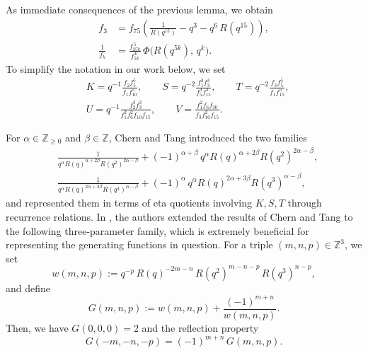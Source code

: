 \documentclass{amsart}
\theoremstyle{definition}
\begin{document}
As immediate consequences of the previous lemma, we obtain
\begin{align}
\label{eq.f3}
f_3&=f_{75}\left(\frac1{R(q^{15})}-q^{3}-q^{6}\,R(q^{15})\right),\\
\label{eq.recip} \frac{1}{f_k}&=\frac{f_{25k}^{\,5}}{f_{5k}^{\,6}}\,\Phi\!\bigl(R(q^{5k}),\,q^k\bigr).
\end{align}
To simplify the notation in our work below, we set
\begin{align}
 \label{K-X}  &K=q^{-1}\frac{f_2f_5^{5}}{f_1f_{10}^{5}},\qquad
S=q^{-2}\frac{f_1^{3}f_3^{3}}{f_5^{3}f_{15}^{3}},\qquad
T=q^{-2}\frac{f_3f_5^{5}}{f_1f_{15}^{5}},\\
\label{V-def}&U=q^{-1}\frac{f_2^{3}f_3^{3}}
{f_1^{2}f_6^{2}f_{10}f_{15}},\qquad V=\frac{f_1^{2}f_6f_{30}}{f_3f_{10}^{2}f_{15}}.
\end{align}

For $\alpha\in\mathbb{Z}_{\ge0}$ and $\beta\in\mathbb{Z}$, Chern and Tang
\cite{CT2021} introduced the two families
\begin{align*}
	&\frac{1}{q^{\alpha}R(q)^{\alpha+2\beta}R(q^{2})^{2\alpha-\beta}}
	+(-1)^{\alpha+\beta}\,q^{\alpha}R(q)^{\alpha+2\beta}R(q^{2})^{2\alpha-\beta},\\
	&\frac{1}{q^{\alpha}R(q)^{2\alpha+3\beta}R(q^{3})^{\alpha-\beta}}
	+(-1)^{\alpha}\,q^{\alpha}R(q)^{2\alpha+3\beta}R(q^{3})^{\alpha-\beta},
\end{align*}
and represented them in terms of eta quotients involving $K, S, T$ through recurrence relations. In \cite{PaudelSellersWang}, the authors extended the results of Chern and Tang to the following three-parameter family, which is extremely beneficial for representing the generating functions in question. For a triple $(m,n,p)\in\mathbb{Z}^{3}$, we set
\begin{equation*}
w(m,n,p):=q^{-p}\,R(q)^{-2m-n}\,R(q^{2})^{m-n-p}\,R(q^{3})^{n-p},
\end{equation*}
and define
\begin{equation}\label{eq.G}
G(m,n,p):=w(m,n,p)+\frac{(-1)^{m+n}}{w(m,n,p)}.
\end{equation}
Then, we have $G(0,0,0)=2$ and the reflection property
\begin{equation}
G(-m,-n,-p)=(-1)^{m+n}\,G(m,n,p).
\label{eq.reflect}
\end{equation}
\end{document}
